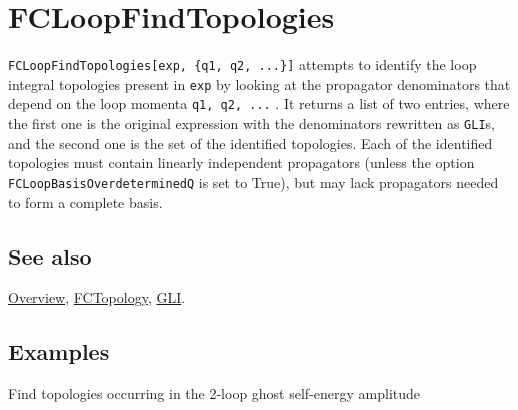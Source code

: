 \documentclass[../FeynCalcManual.tex]{subfiles}
\begin{document}
\hypertarget{fcloopfindtopologies}{
\section{FCLoopFindTopologies}\label{fcloopfindtopologies}}

\texttt{FCLoopFindTopologies[\allowbreak{}exp,\ \allowbreak{}\{\allowbreak{}q1,\ \allowbreak{}q2,\ \allowbreak{}...\}]}
attempts to identify the loop integral topologies present in
\texttt{exp} by looking at the propagator denominators that depend on
the loop momenta \texttt{q1,\ \allowbreak{}q2,\ \allowbreak{}...} . It
returns a list of two entries, where the first one is the original
expression with the denominators rewritten as \texttt{GLI}s, and the
second one is the set of the identified topologies. Each of the
identified topologies must contain linearly independent propagators
(unless the option \texttt{FCLoopBasisOverdeterminedQ} is set to True),
but may lack propagators needed to form a complete basis.

\subsection{See also}

\hyperlink{toc}{Overview}, \hyperlink{fctopology}{FCTopology},
\hyperlink{gli}{GLI}.

\subsection{Examples}

Find topologies occurring in the 2-loop ghost self-energy amplitude

\begin{Shaded}
\begin{Highlighting}[]
\ExtensionTok{=} \OperatorTok{[}\OperatorTok{[\{}\OperatorTok{,} \OperatorTok{,} \OperatorTok{,} 
      \OperatorTok{,} \OperatorTok{\}]]}\NormalTok{;}
\end{Highlighting}
\end{Shaded}

\begin{Shaded}
\begin{Highlighting}[]
\ExtensionTok{=}\OperatorTok{[}\OperatorTok{,} \OperatorTok{\{}\OperatorTok{,}\OperatorTok{\}]}\NormalTok{;}
\end{Highlighting}
\end{Shaded}
\end{document}
